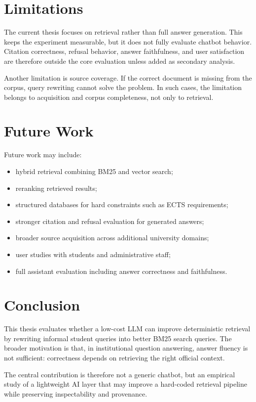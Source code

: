 \section{Limitations}
The current thesis focuses on retrieval rather than full answer generation. This keeps the experiment measurable, but it does not fully evaluate chatbot behavior. Citation correctness, refusal behavior, answer faithfulness, and user satisfaction are therefore outside the core evaluation unless added as secondary analysis.

Another limitation is source coverage. If the correct document is missing from the corpus, query rewriting cannot solve the problem. In such cases, the limitation belongs to acquisition and corpus completeness, not only to retrieval.

\section{Future Work}
Future work may include:

\begin{itemize}
    \item hybrid retrieval combining BM25 and vector search;
    \item reranking retrieved results;
    \item structured databases for hard constraints such as ECTS requirements;
    \item stronger citation and refusal evaluation for generated answers;
    \item broader source acquisition across additional university domains;
    \item user studies with students and administrative staff;
    \item full assistant evaluation including answer correctness and faithfulness.
\end{itemize}

\section{Conclusion}
This thesis evaluates whether a low-cost LLM can improve deterministic retrieval by rewriting informal student queries into better BM25 search queries. The broader motivation is that, in institutional question answering, answer fluency is not sufficient: correctness depends on retrieving the right official context.

The central contribution is therefore not a generic chatbot, but an empirical study of a lightweight AI layer that may improve a hard-coded retrieval pipeline while preserving inspectability and provenance.
\par
